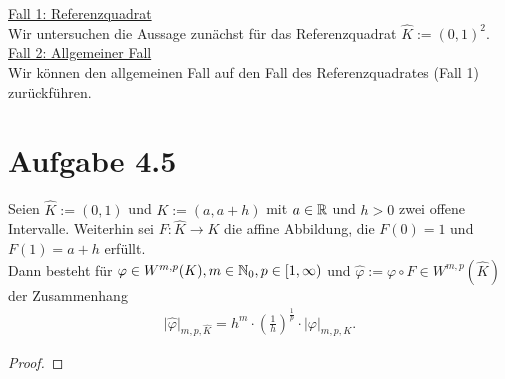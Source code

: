 \documentclass[12pt,a4paper]{article}
\begin{document}
\begin{lösung}
\underline{Fall 1: Referenzquadrat}\\
Wir untersuchen die Aussage zunächst für das Referenzquadrat $\hat{K}:=(0,1)^2$.\\

\underline{Fall 2: Allgemeiner Fall}\\
Wir können den allgemeinen Fall auf den Fall des Referenzquadrates (Fall 1) zurückführen.

\end{lösung}

\section*{Aufgabe 4.5}
Seien $\hat{K}:=(0,1)$ und $K:=(a,a+h)$ mit $a\in\mathbb{R}$ und $h>0$ zwei offene Intervalle. Weiterhin sei $F:\hat{K}\to K$ die affine Abbildung, die $F(0)=1$ und $F(1)=a+h$ erfüllt.\\
Dann besteht für $\varphi\in W^{m,p}(K),m\in\mathbb{N}_0,p\in[1,\infty)$ und $\hat{\varphi}:=\varphi\circ F\in W^{m,p}(\hat{K})$ der Zusammenhang
\begin{align*}
\big|\hat{\varphi}\big|_{m,p,\hat{K}}=h^m\cdot \left(\frac{1}{h}\right)^{\frac{1}{p}}\cdot|\varphi|_{m,p,K}.
\end{align*}
\begin{proof}

\end{proof}
\end{document}
